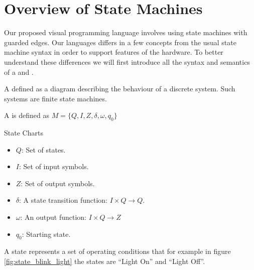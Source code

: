 \section{Overview of State Machines} \label{sec:overviewstatechart}

Our proposed visual programming language involves using state machines with guarded edges. Our languages differs in a few concepts from the usual state machine syntax in order to support features of the hardware. To better understand these differences we will first introduce all the syntax and semantics of a \cite{booth} and \cite{UML2}.

A \cite{booth} defined as a diagram describing the behaviour of a discrete system. Such systems are finite state machines. 

A  is defined as $M = \lbrace Q, I, Z, \delta, \omega, q_0\rbrace$

\begin{definition}
State Charts

\label{def:statecharts}
\begin{itemize}
	\item $Q$: Set of states.
	\item $I$: Set of input symbols.
	\item $Z$: Set of output symbols.
	\item $\delta$: A state transition function: $I \times Q \rightarrow Q$. 
	\item $\omega$: An output function: $I \times Q \rightarrow Z$
	\item $q_0$: Starting state.
\end{itemize}
\end{definition}

A state represents a set of operating conditions that for example in figure \ref{fig:state_blink_light} the states are ``Light On'' and ``Light Off''.

